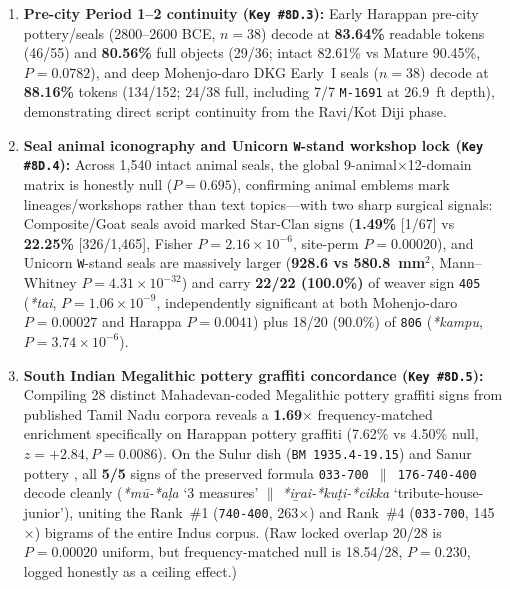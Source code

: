 \documentclass[11pt,a4paper]{article}
\begin{document}
\begin{enumerate}
  \item \textbf{Pre-city Period 1--2 continuity (\texttt{Key \#8D.3}):} Early Harappan pre-city pottery/seals (2800--2600 BCE, $n=38$) decode at \textbf{83.64\%} readable tokens (46/55) and \textbf{80.56\%} full objects (29/36; intact 82.61\% vs Mature 90.45\%, $P = 0.0782$), and deep Mohenjo-daro DKG Early~I seals ($n=38$) decode at \textbf{88.16\%} tokens (134/152; 24/38 full, including 7/7 \texttt{M-1691} at 26.9~ft depth), demonstrating direct script continuity from the Ravi/Kot Diji phase.
  \item \textbf{Seal animal iconography and Unicorn \texttt{W}-stand workshop lock (\texttt{Key \#8D.4}):} Across 1,540 intact animal seals, the global 9-animal$\times$12-domain matrix is honestly null ($P = 0.695$), confirming animal emblems mark lineages/workshops rather than text topics—with two sharp surgical signals: Composite/Goat seals avoid marked Star-Clan signs (\textbf{1.49\%} [1/67] vs \textbf{22.25\%} [326/1,465], Fisher $P = 2.16 \times 10^{-6}$, site-perm $P = 0.00020$), and Unicorn \texttt{W}-stand seals are massively larger (\textbf{928.6 vs 580.8~mm$^2$}, Mann--Whitney $P = 4.31 \times 10^{-32}$) and carry \textbf{22/22 (100.0\%)} of weaver sign \texttt{405} (\textit{*tai}, $P = 1.06 \times 10^{-9}$, independently significant at both Mohenjo-daro $P = 0.00027$ and Harappa $P = 0.0041$) plus 18/20 (90.0\%) of \texttt{806} (\textit{*kampu}, $P = 3.74 \times 10^{-6}$).
  \item \textbf{South Indian Megalithic pottery graffiti concordance (\texttt{Key \#8D.5}):} Compiling 28 distinct Mahadevan-coded Megalithic pottery graffiti signs from published Tamil Nadu corpora \citep{lal1960,mahadevan2001megalithic,mahadevan2006celt,sivanantham2019keeladi,rajan2025} reveals a \textbf{1.69$\times$} frequency-matched enrichment specifically on Harappan pottery graffiti (7.62\% vs 4.50\% null, $z = +2.84, P = 0.0086$). On the Sulur dish (\texttt{BM 1935.4-19.15}) and Sanur pottery \citep{mahadevan2001megalithic}, all \textbf{5/5} signs of the preserved formula \texttt{033-700 $\parallel$ 176-740-400} decode cleanly (\textit{*mū-*aḷa} `3 measures' $\parallel$ \textit{*iṟai-*kuṭi-*cikka} `tribute-house-junior'), uniting the Rank~\#1 (\texttt{740-400}, 263$\times$) and Rank~\#4 (\texttt{033-700}, 145$\times$) bigrams of the entire Indus corpus. (Raw locked overlap 20/28 is $P = 0.00020$ uniform, but frequency-matched null is 18.54/28, $P = 0.230$, logged honestly as a ceiling effect.)
\end{enumerate}
\end{document}
